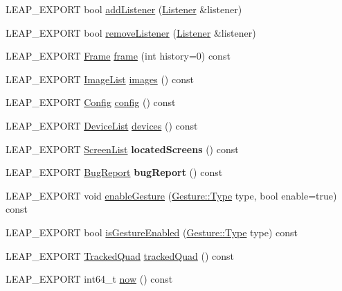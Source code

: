 \begin{DoxyCompactItemize}
\item 
L\+E\+A\+P\+\_\+\+E\+X\+P\+O\+RT bool \hyperlink{class_leap_1_1_controller_a9b6318221593be63a0385748ca66974f}{add\+Listener} (\hyperlink{class_leap_1_1_listener}{Listener} \&listener)
\item 
L\+E\+A\+P\+\_\+\+E\+X\+P\+O\+RT bool \hyperlink{class_leap_1_1_controller_a1a48d46f317f0368cc8f7b0ebfd77728}{remove\+Listener} (\hyperlink{class_leap_1_1_listener}{Listener} \&listener)
\item 
L\+E\+A\+P\+\_\+\+E\+X\+P\+O\+RT \hyperlink{class_leap_1_1_frame}{Frame} \hyperlink{class_leap_1_1_controller_acb45e24fc2583045212f2cfec613f5b0}{frame} (int history=0) const
\item 
L\+E\+A\+P\+\_\+\+E\+X\+P\+O\+RT \hyperlink{class_leap_1_1_image_list}{Image\+List} \hyperlink{class_leap_1_1_controller_ac6fe10acc42b6c830e26fb8fbb88b895}{images} () const
\item 
L\+E\+A\+P\+\_\+\+E\+X\+P\+O\+RT \hyperlink{class_leap_1_1_config}{Config} \hyperlink{class_leap_1_1_controller_ac042539e24f69b873662aa4e4d8ebcfe}{config} () const
\item 
L\+E\+A\+P\+\_\+\+E\+X\+P\+O\+RT \hyperlink{class_leap_1_1_device_list}{Device\+List} \hyperlink{class_leap_1_1_controller_ad3b6ea558fb39cb32c20c3fd44dc5da1}{devices} () const
\item 
\mbox{\label{class_leap_1_1_controller_afb09104303840e59debbc7f9d67157d8}} 
L\+E\+A\+P\+\_\+\+E\+X\+P\+O\+RT \hyperlink{class_leap_1_1_screen_list}{Screen\+List} {\bfseries located\+Screens} () const
\item 
\mbox{\label{class_leap_1_1_controller_a88a64d00b0262489be44781e7620d33b}} 
L\+E\+A\+P\+\_\+\+E\+X\+P\+O\+RT \hyperlink{class_leap_1_1_bug_report}{Bug\+Report} {\bfseries bug\+Report} () const
\item 
L\+E\+A\+P\+\_\+\+E\+X\+P\+O\+RT void \hyperlink{class_leap_1_1_controller_a3e7ee0e1418e1cee5274274d50f3a998}{enable\+Gesture} (\hyperlink{class_leap_1_1_gesture_a6fa6dd4f28c502f0d55abc6b71c6f9b1}{Gesture\+::\+Type} type, bool enable=true) const
\item 
L\+E\+A\+P\+\_\+\+E\+X\+P\+O\+RT bool \hyperlink{class_leap_1_1_controller_ada988c262060d8b3beba2d6d995ed345}{is\+Gesture\+Enabled} (\hyperlink{class_leap_1_1_gesture_a6fa6dd4f28c502f0d55abc6b71c6f9b1}{Gesture\+::\+Type} type) const
\item 
L\+E\+A\+P\+\_\+\+E\+X\+P\+O\+RT \hyperlink{class_leap_1_1_tracked_quad}{Tracked\+Quad} \hyperlink{class_leap_1_1_controller_a2ca6b445093ec79dedc767111bd00a74}{tracked\+Quad} () const
\item 
L\+E\+A\+P\+\_\+\+E\+X\+P\+O\+RT int64\+\_\+t \hyperlink{class_leap_1_1_controller_a2ffddad8225cfb99452d3f62ae3f7e77}{now} () const
\end{DoxyCompactItemize}
